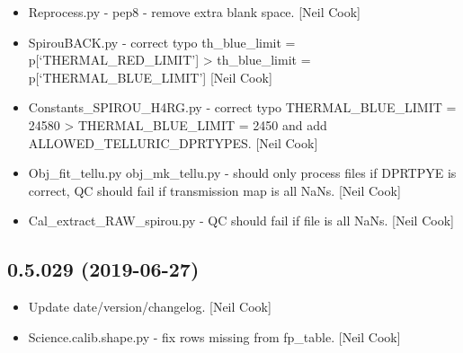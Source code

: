 \documentclass[a4paper,10pt,english]{report}
\begin{document}
\begin{itemize}
\item {} 
Reprocess.py - pep8 - remove extra blank space. {[}Neil Cook{]}

\item {} 
SpirouBACK.py - correct typo th\_blue\_limit = p{[}‘THERMAL\_RED\_LIMIT’{]}
\textendash{}\textgreater{} th\_blue\_limit = p{[}‘THERMAL\_BLUE\_LIMIT’{]} {[}Neil Cook{]}

\item {} 
Constants\_SPIROU\_H4RG.py - correct typo THERMAL\_BLUE\_LIMIT = 24580 \textendash{}\textgreater{}
THERMAL\_BLUE\_LIMIT = 2450 and add ALLOWED\_TELLURIC\_DPRTYPES. {[}Neil
Cook{]}

\item {} 
Obj\_fit\_tellu.py obj\_mk\_tellu.py - should only process files if
DPRTPYE is correct, QC should fail if transmission map is all NaNs.
{[}Neil Cook{]}

\item {} 
Cal\_extract\_RAW\_spirou.py - QC should fail if file is all NaNs. {[}Neil
Cook{]}

\end{itemize}


\subsection{0.5.029 (2019-06-27)}
\label{\detokenize{misc/changelog:id106}}\begin{itemize}
\item {} 
Update date/version/changelog. {[}Neil Cook{]}

\item {} 
Science.calib.shape.py - fix rows missing from fp\_table. {[}Neil Cook{]}

\end{itemize}
\end{document}
